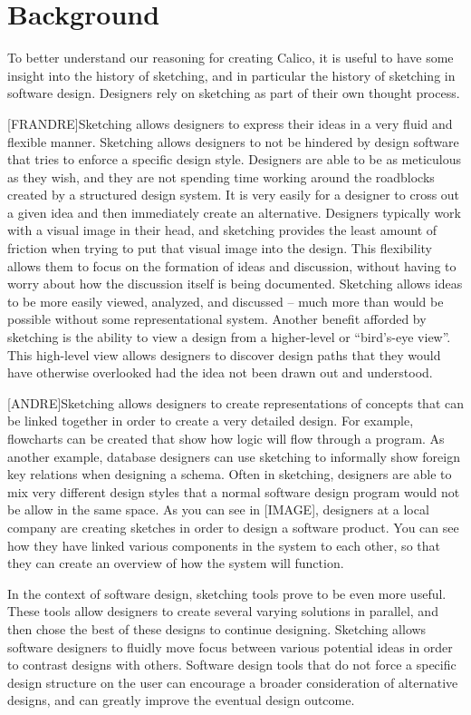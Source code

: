 \chapter{Background}

\indent
To better understand our reasoning for creating Calico, it is useful to have some insight into the history of sketching, and in particular the history of sketching in software design. Designers rely on sketching as part of their own thought process.

[FRANDRE]Sketching allows designers to express their ideas in a very fluid and flexible manner. Sketching allows designers to not be hindered by design software that tries to enforce a specific design style. Designers are able to be as meticulous as they wish, and they are not spending time working around the roadblocks created by a structured design system. It is very easily for a designer to cross out a given idea and then immediately create an alternative. Designers typically work with a visual image in their head\cite{todo}, and sketching provides the least amount of friction when trying to put that visual image into the design. This flexibility allows them to focus on the formation of ideas and discussion, without having to worry about how the discussion itself is being documented.  Sketching allows ideas to be more easily viewed, analyzed, and discussed -- much more than would be possible without some representational system. Another benefit afforded by sketching is the ability to view a design from a higher-level or ``bird’s-eye view''. This high-level view allows designers to discover design paths that they would have otherwise overlooked had the idea not been drawn out and understood. 

[ANDRE]Sketching allows designers to create representations of concepts that can be linked together in order to create a very detailed design. For example, flowcharts can be created that show how logic will flow through a program. As another example, database designers can use sketching to informally show foreign key relations when designing a schema. Often in sketching, designers are able to mix very different design styles that a normal software design program would not be allow in the same space. As you can see in [IMAGE], designers at a local company are creating sketches in order to design a software product. You can see how they have linked various components in the system to each other, so that they can create an overview of how the system will function.

In the context of software design, sketching tools prove to be even more useful. These tools allow designers to create several varying solutions in parallel, and then chose the best of these designs to continue designing. Sketching allows software designers to fluidly move focus between various potential ideas in order to contrast designs with others. Software design tools that do not force a specific design structure on the user can encourage a broader consideration of alternative designs, and can greatly improve the eventual design outcome.
